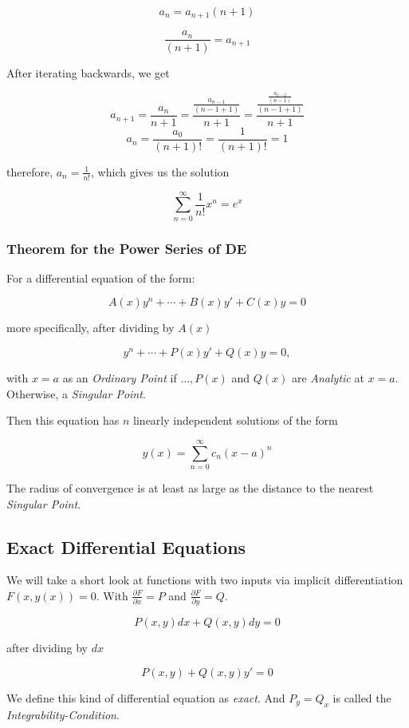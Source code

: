 \[
    a_n = a_{n+1}(n+1)
\]

\[
    \frac{a_n}{(n + 1)} = a_{n+1}
\]

After iterating backwards, we get

\[
    a_{n + 1} = \frac{a_n}{n + 1} = \frac{\frac{a_{n - 1}}{(n - 1 +1)}}{n + 1} =
    \frac{\frac{\frac{a_{n - 2}}{(n - 1)}}{(n - 1 + 1)}}{n + 1}
\]
\[
    a_n = \frac{a_0}{(n + 1)!} = \frac{1}{(n + 1)!} = 1
\]

therefore, \(a_n = \frac{1}{n!}\), which gives us the solution

\[
    \sum_{n = 0}^{\infty}\frac{1}{n!}x^n = e^x
\]

\subsubsection{Theorem for the Power Series of DE}

For a differential equation of the form:

\[
    A(x)y^{n} + \cdots + B(x)y' + C(x)y = 0
\]

more specifically, after dividing by \(A(x)\)

\[
    y^{n} + \cdots + P(x)y' + Q(x)y = 0,
\]

with \(x = a\) as an \emph{Ordinary Point} if \(\dots, P(x)\) and \(Q(x)\) are
\emph{Analytic} at \(x = a\). Otherwise, a \emph{Singular Point}.

Then this equation has \(n\) linearly independent solutions of the form

\[
    y(x) = \sum_{n = 0}^{\infty} c_n {(x - a)}^n
\]

The radius of convergence is at least as large as the distance to the nearest \emph{Singular Point}.

\subsection{Exact Differential Equations}

We will take a short look at functions with two inputs via implicit differentiation \(F(x,y(x)) = 0\).
With \(\frac{\partial F}{\partial x} = P\) and \(\frac{\partial F}{\partial y} = Q\).

\[
    P(x,y)dx + Q(x,y)dy = 0
\]

after dividing by \(dx\)

\[
    P(x,y)+ Q(x,y)y' = 0
\]

We define this kind of differential equation as \emph{exact}. And
\(P_y = Q_x\) is called the \emph{Integrability-Condition}.


